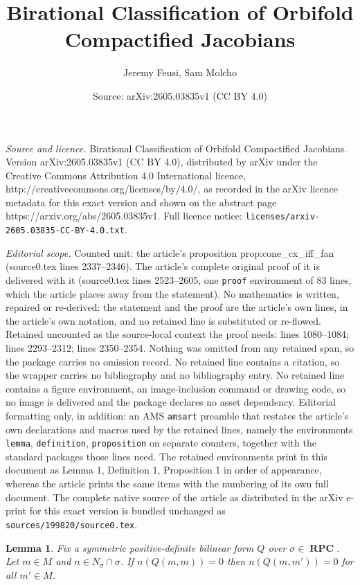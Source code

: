 \documentclass[10pt,a4paper]{amsart}
\title{Birational Classification of Orbifold Compactified Jacobians}
\author{Jeremy Feusi, Sam Molcho}
\date{Source: arXiv:2605.03835v1 (CC BY 4.0)}
\newtheorem{lemma}{Lemma}
\DeclareMathOperator{\RPC}{\mathbf{RPC}}
\begin{document}
\maketitle

\noindent\emph{Source and licence.} Birational Classification of Orbifold Compactified Jacobians. Version arXiv:2605.03835v1 (CC BY 4.0), distributed by arXiv under the Creative Commons Attribution 4.0 International licence, http://creativecommons.org/licenses/by/4.0/, as recorded in the arXiv licence metadata for this exact version and shown on the abstract page https://arxiv.org/abs/2605.03835v1. Full licence notice: \texttt{licenses/arxiv-2605.03835-CC-BY-4.0.txt}.\par\smallskip

\noindent\textit{Editorial scope.} Counted unit: the article's proposition prop:cone\_cx\_iff\_fan (source0.tex lines 2337--2346). The article's complete original proof of it is delivered with it (source0.tex lines 2523--2605, one \texttt{proof} environment of 83 lines, which the article places away from the statement). No mathematics is written, repaired or re-derived: the statement and the proof are the article's own lines, in the article's own notation, and no retained line is substituted or re-flowed.  Retained uncounted as the source-local context the proof needs: lines 1080--1084; lines 2293--2312; lines 2350--2354.  Nothing was omitted from any retained span, so the package carries no omission record.  No retained line contains a citation, so the wrapper carries no bibliography and no bibliography entry.  No retained line contains a figure environment, an image-inclusion command or drawing code, so no image is delivered and the package declares no asset dependency.  Editorial formatting only, in addition: an AMS \texttt{amsart} preamble that restates the article's own declarations and macros used by the retained lines, namely the environments \texttt{lemma}, \texttt{definition}, \texttt{proposition} on separate counters, together with the standard packages those lines need.  The retained environments print in this document as Lemma 1, Definition 1, Proposition 1 in order of appearance, whereas the article prints the same items with the numbering of its own full document.  The complete native source of the article as distributed in the arXiv e-print for this exact version is bundled unchanged as \texttt{sources/199820/source0.tex}.
\begin{lemma}
	\label{lem:pos_definite_vanishing}
	Fix a symmetric positive-definite bilinear form $Q$ over $\sigma\in \RPC$.
	Let $m\in M$ and $n\in N_{\sigma}\cap \sigma$. If $n(Q(m,m))=0$ then $n(Q(m,m'))=0$ for all $m'\in M$.
\end{lemma}
\end{document}
